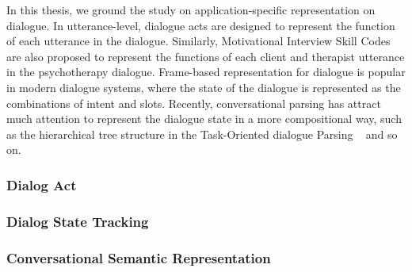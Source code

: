 In this thesis, we ground the study on application-specific
representation on dialogue.  In utterance-level, dialogue acts are
designed to represent the function of each utterance in the
dialogue. Similarly, Motivational Interview Skill Codes
~\cite[MISC,][]{miller2003motivational,miller2012motivational} are
also proposed to represent the functions of each client and therapist
utterance in the psychotherapy dialogue. Frame-based representation
for dialogue is popular in modern dialogue systems, where the state of
the dialogue is represented as the combinations of intent and
slots. Recently, conversational parsing has attract much attention to
represent the dialogue state in a more compositional way, such as the
hierarchical tree structure in the Task-Oriented dialogue Parsing
~\cite[TOP,][]{gupta-etal-2018-semantic-parsing} and so on.

\subsubsection{Dialog Act}

\subsubsection{Dialog State Tracking}

\subsubsection{Conversational Semantic Representation}

